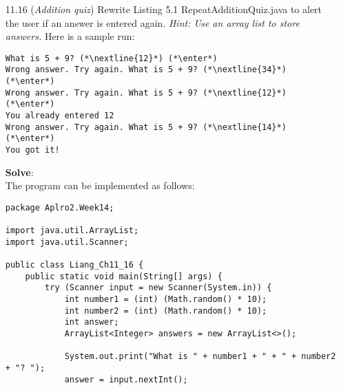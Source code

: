 \documentclass{article}
\newcommand{\enter}{\raisebox{-1.8pt}{\begin{tikzpicture}[scale=0.3]
    \draw[thin,fill=lightgray] (0,0) rectangle (2,1);
    \draw (0.3,0.3) -- (0.7,0.3)--(0.7,0.6);     
\end{tikzpicture}}}
\newcommand{\nextline}[1]{\raisebox{0pt}[1pt]{\colorbox{input}{#1}}}
\newcommand{\jawab}{\textbf{Solve}:}
\begin{document}
\begin{enumerate}
\begin{lstlisting}[backgroundcolor=\color{bg}]
public class CheckMethod extends Liang_Ch11_15{
    public static void main(String[] args) {
        try (Scanner input = new Scanner(System.in)) {
            System.out.print("Enter the number of the points: ");
            int n = input.nextInt();
            System.out.println("Enter the coordinates of the points: ");
            System.out.println("Total area is: " + AreaPolygon(InputPoints(n)));
        }
    }
}
        \end{lstlisting}
        Here is another sample run of the program:
        \begin{lstlisting}[backgroundcolor=\color{vscode},basicstyle=\small\ttfamily\color{white}]
Enter the number of the points: (*\raisebox{0pt}[1pt]{\colorbox{darkgray}{6}}*) (*\enter*)
Enter the coordinates of the points:
(*\raisebox{0pt}[1pt]{\colorbox{darkgray}{4 4 5 -2 -1 -4 -6 0 -2 5 0 1}}*) (*\enter*)
Total area is: 77.0
        \end{lstlisting}
        \item[\color{lblue}11.16] (\textit{Addition quiz}) Rewrite Listing 5.1 RepeatAdditionQuiz.java to alert the user if an answer is entered again. \textit{Hint: Use an array list to store answers.} Here is a sample run:
        \begin{lstlisting}
What is 5 + 9? (*\nextline{12}*) (*\enter*)
Wrong answer. Try again. What is 5 + 9? (*\nextline{34}*) (*\enter*)
Wrong answer. Try again. What is 5 + 9? (*\nextline{12}*) (*\enter*)
You already entered 12
Wrong answer. Try again. What is 5 + 9? (*\nextline{14}*) (*\enter*)
You got it!
        \end{lstlisting}
        \jawab\\
        The program can be implemented as follows:
        \begin{lstlisting}[backgroundcolor=\color{bg}]
package Aplro2.Week14;

import java.util.ArrayList;
import java.util.Scanner;

public class Liang_Ch11_16 {
    public static void main(String[] args) {
        try (Scanner input = new Scanner(System.in)) {
            int number1 = (int) (Math.random() * 10);
            int number2 = (int) (Math.random() * 10);
            int answer;
            ArrayList<Integer> answers = new ArrayList<>();

            System.out.print("What is " + number1 + " + " + number2 + "? ");
            answer = input.nextInt();


\end{lstlisting}
\end{enumerate}
\end{document}
